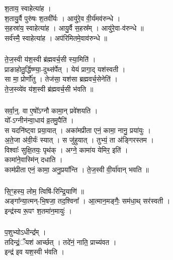 \subsubsection{}
श॒ताय॒ स्वाहेत्या॑ह ।\\
श॒तायु॒र्वै पुरु॑षः श॒तवी᳚र्यः । आयु॑रे॒व वी॒र्य॑मव॑रुन्धे ।\\
स॒हस्रा॑य॒ स्वाहेत्या॑ह । आयु॒र्वै स॒हस्र᳚म् । आयु॑रे॒वा-व॑रुन्धे ॥\\
सर्व॑स्मै॒ स्वाहेत्या॑ह । अप॑रिमितमे॒वाव॑रुन्धे ॥\\
\subsubsection{}
ते॒ज॒स्वी य॑श॒स्वी ब्र॑ह्मवर्च॒सी स्या॒मिति॑ ।\\
प्राङाहोतु॒र्द्धिष्ण्या॒-दुथ्स॑र्पेत् । येयं प्रागा॒द् यश॑स्वती ।\\
सा मा॒ प्रोर्णो॑तु । तेज॑सा॒ यश॑सा ब्रह्मवर्च॒सेनेति॑ ।\\
ते॒ज॒स्व्ये॑व य॑श॒स्वी ब्र॑ह्मवर्च॒सी भ॑वति ॥\\
\subsubsection{}
सर्वा॒न्॒. वा ए॒षो᳚ऽग्नौ कामा॒न् प्रवे॑शयति ।\\
यो᳚-ऽग्नीन॑न्वा॒धाय॑ व्र॒तमु॒पैति॑ ।\\
स यदनि॑ष्ट्वा प्रया॒यात् । अका॑मप्रीता एनं॒ कामा॒ नानु॒ प्रया॑युः ।\\
अ॒ते॒जा अ॑वी॒र्यः॑ स्यात् । स जु॑हुयात् । तुभ्यं॒ ता अ॑ङ्गिरस्तम ।\\
विश्वाः᳚ सुक्षि॒तयः॒ पृथ॑क् । अग्ने॒ कामा॑य येमिर॒ इति॑ ।\\
कामा॑ने॒वास्मि॑न् दधाति ।\\
काम॑प्रीता एनं॒ कामा॒ अनु॒प्रया᳚न्ति । ते॒ज॒स्वी वी॒र्या॑वान् भवति ॥\\
\subsubsection{}
सि॒ꣳ॒हस्य॒ लोम॒ त्विषि॑-रिन्द्रि॒याणि॑ ॥\\
अङ्गा᳚न्या॒त्मन्-भि॒षजा॒ तद॒श्विना᳚ । आ॒त्मान॒मङ्गैः॒ सम॑धा॒थ् सर॑स्वती ।\\
इन्द्र॑स्य रू॒पꣳ श॒तमा॑न॒मायुः॑ ।\\
\subsubsection{}
प॒शुभ्योऽधीन्द्र᳚म् ।\\
तदिन्द्रं॒ँयश॑ आर्च्छत् । तदे॑नं॒ नाति॒ प्राच्य॑वत ।\\
इन्द्र॑ इव यश॒स्वी भ॑वति ।\\
